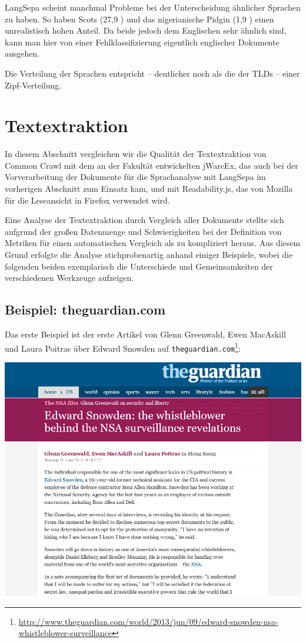 \documentclass[a4paper,12pt,titlepage=false]{scrreprt}
\begin{document}
LangSepa scheint manchmal Probleme bei der Unterscheidung ähnlicher Sprachen zu haben. So haben Scots (27,9 \textperthousand) und das nigerianische Pidgin (1,9 \textperthousand) einen unrealistisch hohen Anteil. Da beide jedoch dem Englischen sehr ähnlich sind, kann man hier von einer Fehlklassifizierung eigentlich englischer Dokumente ausgehen.

Die Verteilung der Sprachen entspricht -- deutlicher noch als die der TLDs -- einer Zipf-Verteilung.


\chapter{Textextraktion}

In diesem Abschnitt vergleichen wir die Qualität der Textextraktion von Common Crawl mit dem an der Fakultät entwickelten jWarcEx, das auch bei der Vorverarbeitung der Dokumente für die Sprachanalyse mit LangSepa im vorherigen Abschnitt zum Einsatz kam, und mit Readability.js, das von Mozilla für die Leseansicht in Firefox verwendet wird.

Eine Analyse der Textextraktion durch Vergleich aller Dokumente stellte sich aufgrund der großen Datenmenge und Schwierigkeiten bei der Definition von Metriken für einen automatischen Vergleich als zu kompliziert heraus. Aus diesem Grund erfolgte die Analyse stichprobenartig anhand einiger Beispiele, wobei die folgenden beiden exemplarisch die Unterschiede und Gemeinsamkeiten der verschiedenen Werkzeuge aufzeigen.

\section{Beispiel: theguardian.com}

Das erste Beispiel ist der erste Artikel von Glenn Greenwald, Ewen MacAskill und Laura Poitras über Edward Snowden auf \texttt{theguardian.com}\footnote{\url{http://www.theguardian.com/world/2013/jun/09/edward-snowden-nsa-whistleblower-surveillance}}:

\begin{center}
    \includegraphics[trim=0 130px 0 0, clip=true, width=.75\textwidth]{images/guardian-website}
\end{center}
\end{document}
